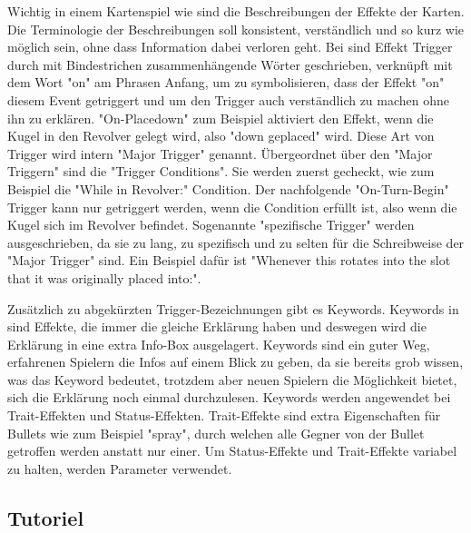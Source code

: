 Wichtig in einem Kartenspiel wie \FF sind die Beschreibungen der Effekte der Karten. Die Terminologie der Beschreibungen
soll konsistent, verständlich und so kurz wie möglich sein, ohne dass Information dabei verloren geht. Bei \FF sind
Effekt Trigger durch mit Bindestrichen zusammenhängende Wörter geschrieben, verknüpft mit dem Wort "on" am Phrasen Anfang, um zu symbolisieren,
dass der Effekt "on" diesem Event getriggert und um den Trigger auch verständlich zu machen ohne ihn zu erklären.
"On-Placedown" zum Beispiel aktiviert den Effekt, wenn die Kugel in den Revolver gelegt wird, also "down geplaced" wird.
Diese Art von Trigger wird intern "Major Trigger" genannt.
Übergeordnet über den "Major Triggern" sind die "Trigger Conditions". Sie werden zuerst gecheckt, wie zum Beispiel die "While in Revolver:" Condition.
Der nachfolgende "On-Turn-Begin" Trigger kann nur getriggert werden, wenn die Condition erfüllt ist, also wenn die Kugel sich im Revolver befindet. %
Sogenannte "spezifische Trigger" werden ausgeschrieben, da sie zu lang, zu spezifisch und zu selten für die Schreibweise der "Major Trigger" sind. Ein Beispiel dafür ist
"Whenever this rotates into the slot that it was originally placed into:".


Zusätzlich zu abgekürzten Trigger-Bezeichnungen gibt es Keywords. Keywords in \FF sind Effekte, die immer die gleiche
Erklärung haben und deswegen wird die Erklärung in eine extra Info-Box ausgelagert. %
Keywords sind ein guter Weg, erfahrenen Spielern die Infos auf einem Blick zu geben, da sie bereits grob wissen, was das
Keyword bedeutet, trotzdem aber neuen Spielern die Möglichkeit bietet, sich die Erklärung noch einmal durchzulesen.
Keywords werden angewendet bei Trait-Effekten und Status-Effekten. Trait-Effekte sind extra Eigenschaften für Bullets
wie zum Beispiel "spray", durch welchen alle Gegner von der Bullet getroffen werden anstatt nur einer.
Um Status-Effekte und Trait-Effekte variabel zu halten, werden Parameter verwendet. %





\subsection{Tutoriel}\label{subsec:placementMatters}


